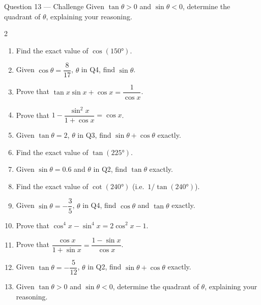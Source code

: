 \documentclass[11pt]{article}
\begin{document}
\begin{qbox}{Question 13 --- Challenge}
Given $\tan\theta>0$ and $\sin\theta<0$, determine the quadrant of $\theta$, explaining your reasoning.\workspace{3cm}
\end{qbox}

\clearpage
{}

\begin{recapbox}
\begin{multicols}{2}
\small
\begin{enumerate}[leftmargin=*,itemsep=3pt]
  \item Find the exact value of $\cos(150°)$.
  \item Given $\cos\theta=\dfrac{8}{17}$, $\theta$ in Q4, find $\sin\theta$.
  \item Prove that $\tan x\sin x+\cos x=\dfrac{1}{\cos x}$.
  \item Prove that $1-\dfrac{\sin^2x}{1+\cos x}=\cos x$.
  \item Given $\tan\theta=2$, $\theta$ in Q3, find $\sin\theta+\cos\theta$ exactly.
  \item Find the exact value of $\tan(225°)$.
  \item Given $\sin\theta=0.6$ and $\theta$ in Q2, find $\tan\theta$ exactly.
  \item Find the exact value of $\cot(240°)$ (i.e.\ $1/\tan(240°)$).
  \item Given $\sin\theta=-\dfrac35$, $\theta$ in Q4, find $\cos\theta$ and $\tan\theta$ exactly.
  \item Prove that $\cos^4x-\sin^4x=2\cos^2x-1$.
  \item Prove that $\dfrac{\cos x}{1+\sin x}=\dfrac{1-\sin x}{\cos x}$.
  \item Given $\tan\theta=-\dfrac{5}{12}$, $\theta$ in Q2, find $\sin\theta+\cos\theta$ exactly.
  \item Given $\tan\theta>0$ and $\sin\theta<0$, determine the quadrant of $\theta$, explaining your reasoning.
\end{enumerate}
\end{multicols}
\end{recapbox}
\end{document}
